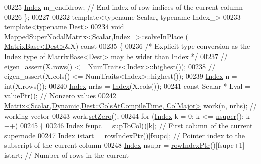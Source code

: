 \begin{DoxyCode}
00225     \hyperlink{namespace_eigen_a62e77e0933482dafde8fe197d9a2cfde}{Index} m\_endidrow;                       \textcolor{comment}{// End index of row indices of the current column}
00226 \};
00227 
00232 \textcolor{keyword}{template}<\textcolor{keyword}{typename} Scalar, \textcolor{keyword}{typename} Index\_>
00233 \textcolor{keyword}{template}<\textcolor{keyword}{typename} Dest>
00234 \textcolor{keywordtype}{void} \hyperlink{group___sparse_l_u___module_ab93581127fd87b6bc467b6f67fcf4eeb}{MappedSuperNodalMatrix<Scalar,Index\_>::solveInPlace}
      ( \hyperlink{group___core___module_class_eigen_1_1_matrix_base}{MatrixBase<Dest>}&X)\textcolor{keyword}{ const}
00235 \textcolor{keyword}{}\{
00236     \textcolor{comment}{/* Explicit type conversion as the Index type of MatrixBase<Dest> may be wider than Index */}
00237 \textcolor{comment}{//    eigen\_assert(X.rows() <= NumTraits<Index>::highest());}
00238 \textcolor{comment}{//    eigen\_assert(X.cols() <= NumTraits<Index>::highest());}
00239     \hyperlink{namespace_eigen_a62e77e0933482dafde8fe197d9a2cfde}{Index} n    = int(X.rows());
00240     \hyperlink{namespace_eigen_a62e77e0933482dafde8fe197d9a2cfde}{Index} nrhs = \hyperlink{namespace_eigen_a62e77e0933482dafde8fe197d9a2cfde}{Index}(X.cols());
00241     \textcolor{keyword}{const} Scalar * Lval = \hyperlink{group___sparse_l_u___module_a6e9ce7d448b76811802d11baf3da97d3}{valuePtr}();                 \textcolor{comment}{// Nonzero values }
00242     \hyperlink{group___core___module_class_eigen_1_1_matrix}{Matrix<Scalar,Dynamic,Dest::ColsAtCompileTime, ColMajor>}
       work(n, nrhs);     \textcolor{comment}{// working vector}
00243     work.\hyperlink{class_eigen_1_1_plain_object_base_ac21ad5f989f320e46958b75ac8d9a1da}{setZero}();
00244     \textcolor{keywordflow}{for} (\hyperlink{namespace_eigen_a62e77e0933482dafde8fe197d9a2cfde}{Index} k = 0; k <= \hyperlink{group___sparse_l_u___module_a9c0b29102914a6ef9cfd6280fa016fa8}{nsuper}(); k ++)
00245     \{
00246       \hyperlink{namespace_eigen_a62e77e0933482dafde8fe197d9a2cfde}{Index} fsupc = \hyperlink{group___sparse_l_u___module_ab2b1bdd663288f1f2af09ec42a0a62a5}{supToCol}()[k];                    \textcolor{comment}{// First column of the current supernode
       }
00247       \hyperlink{namespace_eigen_a62e77e0933482dafde8fe197d9a2cfde}{Index} istart = \hyperlink{group___sparse_l_u___module_a826186a823bf49f81b20673cce741250}{rowIndexPtr}()[fsupc];            \textcolor{comment}{// Pointer index to the subscript of
       the current column}
00248       \hyperlink{namespace_eigen_a62e77e0933482dafde8fe197d9a2cfde}{Index} nsupr = \hyperlink{group___sparse_l_u___module_a826186a823bf49f81b20673cce741250}{rowIndexPtr}()[fsupc+1] - istart;  \textcolor{comment}{// Number of rows in the current
}
\end{DoxyCode}
